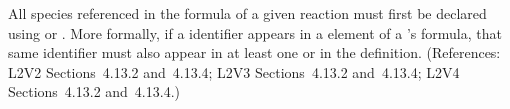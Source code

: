 All species referenced in the \StoichiometryMath formula of a given reaction
must first be declared using \SpeciesReference or \ModifierSpeciesReference.
More formally, if a \Species identifier appears in a  element of a
\Reaction's \StoichiometryMath formula, that same identifier must also appear
in at least one \SpeciesReference or \ModifierSpeciesReference in the
\Reaction definition.  (References: L2V2 Sections~4.13.2 and~4.13.4; L2V3
Sections~4.13.2 and~4.13.4; L2V4 Sections~4.13.2 and~4.13.4.)
